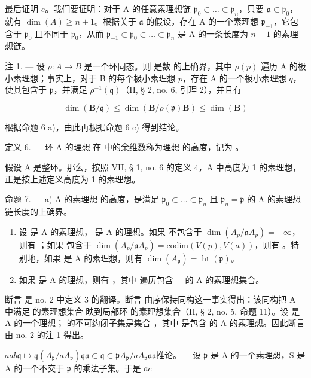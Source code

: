 最后证明 \(e\)。我们要证明：对于 A 的任意素理想链 \(\mathfrak{p}_{0} \subset \ldots \subset \mathfrak{p}_{n}\)，只要 \(\mathfrak{a} \subset \mathfrak{p}_{0}\)，就有 \(\dim(A) \geqslant n + 1\)。根据关于 \(\mathfrak{a}\) 的假设，存在 A 的一个素理想 \(\mathfrak{p}_{-1}\)，它包含于 \(\mathfrak{p}_{0}\) 且不同于 \(\mathfrak{p}_{0}\)，从而 \(\mathfrak{p}_{-1} \subset \mathfrak{p}_{0} \subset \ldots \subset \mathfrak{p}_{n}\) 是 A 的一条长度为 \(n + 1\) 的素理想链。

注 1. --- 设 \(\rho: A \to B\) 是一个环同态。则  是数  的上确界，其中 \(\rho(p)\) 遍历 A 的极小素理想；事实上，对于 B 的每个极小素理想 \(p\)，存在 A 的一个极小素理想 \(q\)，使其包含于 \(\mathfrak{p}\)，并满足 \(\rho^{-1}(\mathfrak{q})\)（II, § 2, no. 6, 引理 2），并且有

\[
\dim (\mathbf {B} / \mathfrak {q}) \leqslant \dim (\mathbf {B} / \rho (\mathfrak {p})\mathbf {B}) \leqslant \dim (\mathbf {B})
\]

根据命题 6 a)，由此再根据命题 6 c) 得到结论。

定义 6. --- 环 A 的理想  在  中的余维数称为理想  的高度，记为 。

假设 A 是整环。那么，按照 VII, § 1, no. 6 的定义 4，A 中高度为 1 的素理想，正是按上述定义高度为 1 的素理想。

命题 7. --- a) A 的素理想  的高度，是满足 \(\mathfrak{p}_{0} \subset \ldots \subset \mathfrak{p}_{n}\) 且 \(\mathfrak{p}_{n} = \mathfrak{p}\) 的 A 的素理想链长度的上确界。

\begin{enumerate}
\def\labelenumi{\alph{enumi})}
\setcounter{enumi}{1}
\item
设  是 A 的素理想， 是 A 的理想。如果  不包含于 \(\dim(A_{p}/\mathfrak{a}A_{p}) = -\infty\)，则有 ；如果  包含于 \(\dim(A_{p}/\mathfrak{a}A_{p}) = \text{codim}(V(p), V(a))\)，则有 。特别地，如果  是 A 的素理想，则有 \(\dim(A_{\mathfrak{p}}) = \operatorname{ht}(\mathfrak{p})\)。
\item
如果  是 A 的理想，则有 ，其中  遍历包含 \_ 的 A 的素理想集合。
\end{enumerate}

断言  是 no. 2 中定义 3  的翻译。断言  由序保持同构这一事实得出：该同构把 A 中满足  的素理想集合  映到局部环  的素理想集合（II, § 2, no. 5, 命题 11）。设  是 A 的一个理想；  的不可约闭子集是集合 ，其中  是包含  的 A 的素理想。因此断言  由 no. 2 的注 1 得出。

\(a\)\(a\)\(b\)\(\mathfrak{q} \mapsto \mathfrak{q}(A_{\mathfrak{p}} / aA_{\mathfrak{p}})\)\(\mathfrak{q}\)\(\mathfrak{a} \subset \mathfrak{q} \subset \mathfrak{p}\)\(A_{\mathfrak{p}} / aA_{\mathfrak{p}}\)\(\mathfrak{a}\)\(\mathfrak{a}\)推论。--- 设 \(\mathfrak{p}\) 是 A 的一个素理想，S 是 A 的一个不交于 \(\mathfrak{p}\) 的乘法子集。于是 \(\mathfrak{a}\)\(c\)

